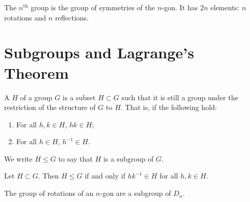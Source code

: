 \documentclass[12pt]{report}
\begin{document}
\begin{example}
  The \(n^{\text{th}}\)  group is the group of symmetries of the \(n\)-gon.
  It has \(2n\) elements: \(n\) rotations and \(n\) reflections.

  \begin{centre}
  \end{centre}
\end{example}


\section{Subgroups and Lagrange's Theorem}

\begin{definition}\label{def:group-theory:subgroup}
  A  \(H\) of a group \(G\) is a subset \(H \subset G\) such that it is still a group under the restriction of the structure of \(G\) to \(H\).
  That is, if the following hold:
  \begin{enumerate}
  \item For all \(h, k \in H\), \(hk \in H\);
  \item For all \(h \in H\), \(h^{-1} \in H\).
  \end{enumerate}


  We write \(H \leq G\) to say that \(H\) is a subgroup of \(G\).
\end{definition}


\begin{lemma}\label{lem:group-theory:subgroup-test}
  Let \(H \subset G\).
  Then \(H \leq G\) if and only if \(hk^{-1} \in H\) for all \(h,k \in H\).
\end{lemma}


\begin{example}
  The group of rotations of an \(n\)-gon are a subgroup of \(D_{n}\).
\end{example}
\end{document}
